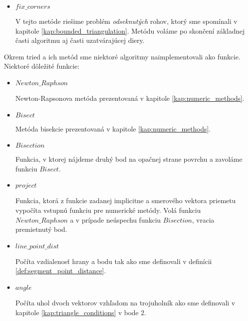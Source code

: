 \begin{itemize}
{\begin{itemize}
{                Metóda, v ktorej sa v správnom poradí volajú ďalšie metódy tak ako boli opísané v 
                kapitole \ref{kap:second_part_of_algorithm}. Tieto metódy sú rovnaké ako pre prvú
                časť algoritmu avšak vypúšťame v nich overovanie \textit{Delaunayovej podmienky} a
                podmienky s blízkosťou ťažiska.
                Ak sa nám v žiadnej z týchto metód neporadí nájsť nový trojuholník na konci kroku 
                označíme hranu $E = (x_i, x_j)$ za skontrolovanú.
            }
            \item{
                $fix\_corners$

                V tejto metóde riešime problém \textit{odseknutých} rohov, ktorý sme spomínali v
                kapitole \ref{kap:bounded_triangulation}.
                Metódu voláme po skončení základnej časti algoritmu aj časti uzatvárajúcej diery.
            }
        \end{itemize}
        }

\end{itemize}
Okrem tried a ich metód sme niektoré algoritmy naimplementovali ako funkcie. 
        Niektoré dôležité funkcie:
        \begin{itemize}
            \item{
                $Newton\_Raphson$

                Newton-Rapsonova metóda prezentovaná v kapitole \ref{kap:numeric_methods}.
            }
            \item{
                $Bisect$

                Metóda bisekcie prezentovaná v kapitole \ref{kap:numeric_methods}.
            }
            \item{
                $Bisection$

                Funkcia, v ktorej nájdeme druhý bod na opačnej strane povrchu a zavoláme
                funkciu $Bisect$.
            }
            \item{
                $project$

                Funkcia, ktorá z funkcie zadanej implicitne a smerového vektora priemetu
                vypočíta vstupnú funkciu pre numerické metódy. Volá funkciu $Newton\_Raphson$
                a v prípade neúspechu funkciu $Bisection$, vracia premietnutý bod.
            }
            \item{
                $line\_point\_dist$

                Počíta vzdialenosť hrany a bodu tak ako sme definovali v definícii 
                \ref{def:segment_point_distance}.
            }
            \item{
                $angle$

                Počíta uhol dvoch vektorov vzhľadom na trojuholník ako sme definovali v kapitole 
                \ref{kap:triangle_conditions} v bode $2$.
            }
        \end{itemize}
